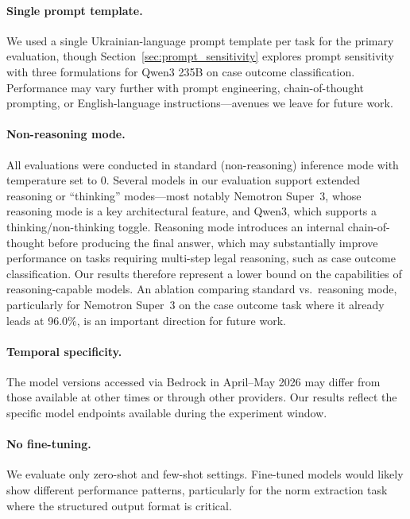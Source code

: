 \documentclass[11pt,a4paper]{article}
\begin{document}
\paragraph{Single prompt template.} We used a single Ukrainian-language prompt template per task for the primary evaluation, though Section~\ref{sec:prompt_sensitivity} explores prompt sensitivity with three formulations for Qwen3 235B on case outcome classification. Performance may vary further with prompt engineering, chain-of-thought prompting, or English-language instructions---avenues we leave for future work.

\paragraph{Non-reasoning mode.} All evaluations were conducted in standard (non-reasoning) inference mode with temperature set to 0. Several models in our evaluation support extended reasoning or ``thinking'' modes---most notably Nemotron Super~3, whose reasoning mode is a key architectural feature, and Qwen3, which supports a thinking/non-thinking toggle. Reasoning mode introduces an internal chain-of-thought before producing the final answer, which may substantially improve performance on tasks requiring multi-step legal reasoning, such as case outcome classification. Our results therefore represent a lower bound on the capabilities of reasoning-capable models. An ablation comparing standard vs.\ reasoning mode, particularly for Nemotron Super~3 on the case outcome task where it already leads at 96.0\%, is an important direction for future work.

\paragraph{Temporal specificity.} The model versions accessed via Bedrock in April--May 2026 may differ from those available at other times or through other providers. Our results reflect the specific model endpoints available during the experiment window.

\paragraph{No fine-tuning.} We evaluate only zero-shot and few-shot settings. Fine-tuned models would likely show different performance patterns, particularly for the norm extraction task where the structured output format is critical.
\end{document}
